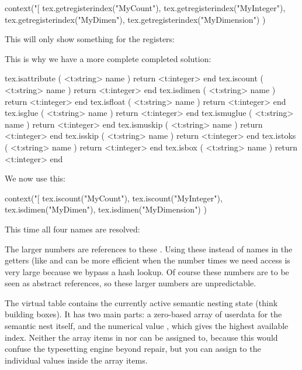\startluacode
    context("[%
        tex.getregisterindex("MyCount"),
        tex.getregisterindex("MyInteger"),
        tex.getregisterindex("MyDimen"),
        tex.getregisterindex("MyDimension")
    )
\stopluacode
\stopbuffer

\typebuffer[option=LUA]

This will only show something for the registers:

\getbuffer

This is why we have a more complete completed solution:

\starttyping[option=LUA]
tex.isattribute ( <t:string> name ) return <t:integer> end
tex.iscount     ( <t:string> name ) return <t:integer> end
tex.isdimen     ( <t:string> name ) return <t:integer> end
tex.isfloat     ( <t:string> name ) return <t:integer> end
tex.isglue      ( <t:string> name ) return <t:integer> end
tex.ismuglue    ( <t:string> name ) return <t:integer> end
tex.ismuskip    ( <t:string> name ) return <t:integer> end
tex.isskip      ( <t:string> name ) return <t:integer> end
tex.istoks      ( <t:string> name ) return <t:integer> end
tex.isbox       ( <t:string> name ) return <t:integer> end
\stoptyping

We now use this:

\startbuffer
\startluacode
    context("[%
        tex.iscount("MyCount"),
        tex.iscount("MyInteger"),
        tex.isdimen("MyDimen"),
        tex.isdimen("MyDimension")
    )
\stopluacode
\stopbuffer

\typebuffer[option=LUA]

This time all four names are resolved:

\getbuffer

The larger numbers are references to these . Using these
instead of names in the getters (like  and  can
be more efficient when the number times we need access is very large because we
bypass a hash lookup. Of course these numbers are to be seen as abstract
references, so these larger numbers are unpredictable.

\stopsubsection

\startsubsection[title=Nesting]

The virtual table  contains the currently active semantic nesting
state (think building boxes). It has two main parts: a zero-based array of
userdata for the semantic nest itself, and the numerical value , which
gives the highest available index. Neither the array items in  nor
 can be assigned to, because this would confuse the typesetting engine
beyond repair, but you can assign to the individual values inside the array
items.

